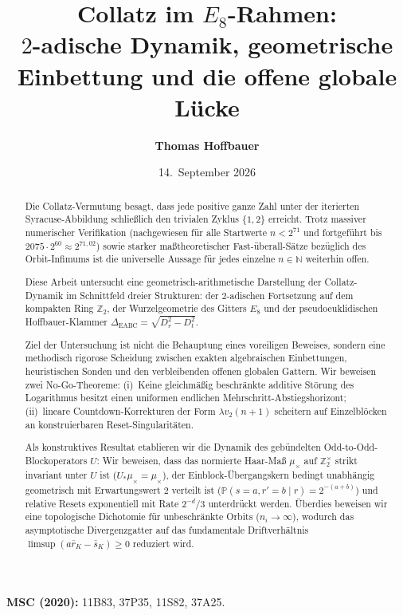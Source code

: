 \documentclass[11pt,reqno]{amsart}
\title{\textbf{\texorpdfstring{
Collatz im $E_8$-Rahmen:\\
$2$-adische Dynamik, geometrische Einbettung und die offene globale Lücke
}{
Collatz im E8-Rahmen:
2-adische Dynamik, geometrische Einbettung und die offene globale Luecke
}}}
\author{\textbf{Thomas Hoffbauer}}
\date{14.~September 2026}
\theoremstyle{definition}
\theoremstyle{remark}
\numberwithin{equation}{section}
\begin{document}
\maketitle

\begin{abstract}
Die Collatz-Vermutung besagt, dass jede positive ganze Zahl unter der iterierten Syracuse-Abbildung schließlich den trivialen Zyklus $\{1, 2\}$ erreicht. Trotz massiver numerischer Verifikation (nachgewiesen für alle Startwerte $n < 2^{71}$ und fortgeführt bis $2075 \cdot 2^{60} \approx 2^{71{,}02}$) sowie starker maßtheoretischer Fast-überall-Sätze bezüglich des Orbit-Infimums ist die universelle Aussage für jedes einzelne $n \in \mathbb{N}$ weiterhin offen.

Diese Arbeit untersucht eine geometrisch-arithmetische Darstellung der Collatz-Dynamik im Schnittfeld dreier Strukturen: der $2$-adischen Fortsetzung auf dem kompakten Ring $\mathbb{Z}_2$, der Wurzelgeometrie des Gitters $E_8$ und der pseudoeuklidischen Hoffbauer-Klammer $\Delta_{\mathrm{EABC}} = \sqrt{D_r^2 - D_t^2}$.

Ziel der Untersuchung ist nicht die Behauptung eines voreiligen Beweises, sondern eine methodisch rigorose Scheidung zwischen exakten algebraischen Einbettungen, heuristischen Sonden und den verbleibenden offenen globalen Gattern. Wir beweisen zwei No-Go-Theoreme: (i)~Keine gleichmäßig beschränkte additive Störung des Logarithmus besitzt einen uniformen endlichen Mehrschritt-Abstiegshorizont; (ii)~lineare Countdown-Korrekturen der Form $\lambda v_2(n+1)$ scheitern auf Einzelblöcken an konstruierbaren Reset-Singularitäten. 

Als konstruktives Resultat etablieren wir die Dynamik des gebündelten Odd-to-Odd-Blockoperators $U$: Wir beweisen, dass das normierte Haar-Maß $\mu_\times$ auf $\mathbb{Z}_2^\times$ strikt invariant unter $U$ ist ($U_* \mu_\times = \mu_\times$), der Einblock-Übergangskern bedingt unabhängig geometrisch mit Erwartungswert $2$ verteilt ist ($\mathbb{P}(s=a, r'=b \mid r) = 2^{-(a+b)}$) und relative Resets exponentiell mit Rate $2^{-d}/3$ unterdrückt werden. Überdies beweisen wir eine topologische Dichotomie für unbeschränkte Orbits ($n_i \to \infty$), wodurch das asymptotische Divergenzgatter auf das fundamentale Driftverhältnis $\limsup (a \bar{r}_K - \bar{s}_K) \ge 0$ reduziert wird.
\end{abstract}

\medskip

\noindent\textbf{MSC (2020):}
11B83, 37P35, 11S82, 37A25.
\end{document}
